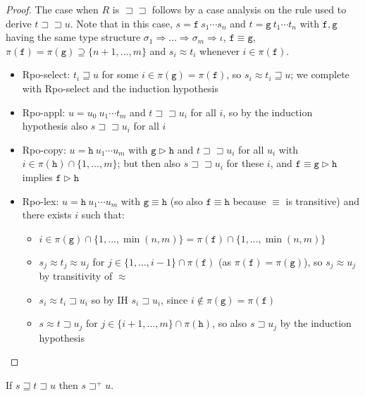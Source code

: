 \documentclass[a4paper,USenglish,cleveref,autoref,thm-restate]{lipics-v2021}
\newcommand{\arrtype}{\Rightarrow}
\newcommand{\grmain}{\sqsupset}
\newcommand{\geqmain}{\sqsupseteq}
\newcommand{\ismain}{\approx}
\newcommand{\rpomain}{\sqsupset\!\!\sqsupset}
\newcommand{\grpred}{\rhd}
\newcommand{\eqpred}{\equiv}
\newcommand{\symb}[1]{\mathtt{#1}}
\newcommand{\afun}{\symb{f}}
\newcommand{\bfun}{\symb{g}}
\newcommand{\cfun}{\symb{h}}
\newcommand{\atype}{\sigma}
\newcommand{\asort}{\iota}
\newcommand{\filter}{\pi}
\begin{document}
\begin{proof}
The case when $R$ is $\rpomain$ follows by a case analysis on the rule used to derive $t \rpomain u$.
Note that in this case, $s = \afun\ s_1 \cdots s_n$ and $t = \bfun\ t_1 \cdots t_n$ with
$\afun,\bfun$ having the same type structure $\atype_1 \arrtype \dots \arrtype \atype_m \arrtype
\asort$, $\afun \eqpred \bfun$, $\filter(\afun) = \filter(\bfun) \supseteq \{n+1,\dots,m\}$ and
$s_i \ismain t_i$ whenever $i \in \pi(\afun)$.
\begin{itemize}
\item Rpo-select: $t_i \geqmain u$ for some $i \in \pi(\bfun) = \pi(\afun)$, so
  $s_i \ismain t_i \geqmain u$; we complete with Rpo-select and the induction hypothesis
\item Rpo-appl: $u = u_0\ u_1 \cdots t_m$ and $t \rpomain u_i$ for all $i$, so by the induction
  hypothesis also $s \rpomain u_i$ for all $i$
\item Rpo-copy: $u = \cfun\ u_1 \cdots u_m$ with $\bfun \grpred \cfun$ and $t \rpomain u_i$ for all
  $u_i$ with $i \in \filter(\cfun) \cap \{1,\dots,m\}$; but then also $s \rpomain u_i$ for these
  $i$, and $\afun \eqpred \bfun \grpred \cfun$ implies $\afun \grpred \cfun$
\item Rpo-lex: $u = \cfun\ u_1 \cdots u_m$ with $\bfun \eqpred \cfun$ (so also $\afun \eqpred
  \cfun$ because $\eqpred$ is transitive) and there exists $i$ such that:
  \begin{itemize}
  \item $i \in \filter(\bfun) \cap \{1,\dots,\min(n,m)\} = \filter(\afun) \cap \{1,\dots,\min(n,m)\}$
  \item $s_j \ismain t_j \ismain u_j$ for $j \in \{1,\dots,i-1\} \cap \filter(\afun)$ (as
    $\filter(\afun) = \filter(\bfun)$), so $s_j \ismain u_j$ by transitivity of $\ismain$
  \item $s_i \ismain t_i \grmain u_i$ so by IH $s_i \grmain u_i$,
    since $i \notin \filter(\bfun) = \filter(\afun)$
  \item $s \ismain t \grmain u_j$ for $j \in \{i+1,\dots,m\} \cap \filter(\cfun)$, so also
    $s \grmain u_j$ by the induction hypothesis
    \qedhere
  \end{itemize}
\end{itemize}
\end{proof}

\begin{corollary}\label{cor:compatibility}
If $s \geqmain t \grmain u$ then $s \grmain^+ u$.
\end{corollary}
\end{document}
